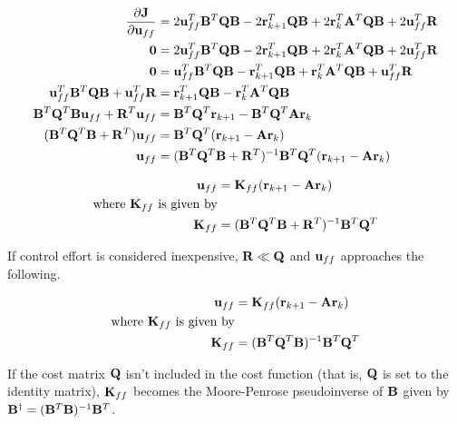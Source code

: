 \begin{align*}
  \frac{\partial\mathbf{J}}{\partial\mathbf{u}_{ff}} &=
    2\mathbf{u}_{ff}^T\mathbf{B}^T\mathbf{Q}\mathbf{B} - 2\mathbf{r}_{k+1}^T\mathbf{Q}\mathbf{B} +
    2\mathbf{r}_k^T\mathbf{A}^T\mathbf{Q}\mathbf{B} + 2\mathbf{u}_{ff}^T\mathbf{R} \\
  \mathbf{0} &= 2\mathbf{u}_{ff}^T\mathbf{B}^T\mathbf{Q}\mathbf{B} -
    2\mathbf{r}_{k+1}^T\mathbf{Q}\mathbf{B} + 2\mathbf{r}_k^T\mathbf{A}^T\mathbf{Q}\mathbf{B} +
    2\mathbf{u}_{ff}^T\mathbf{R} \\
  \mathbf{0} &= \mathbf{u}_{ff}^T\mathbf{B}^T\mathbf{Q}\mathbf{B} -
    \mathbf{r}_{k+1}^T\mathbf{Q}\mathbf{B} + \mathbf{r}_k^T\mathbf{A}^T\mathbf{Q}\mathbf{B} +
    \mathbf{u}_{ff}^T\mathbf{R} \\
  \mathbf{u}_{ff}^T\mathbf{B}^T\mathbf{Q}\mathbf{B} + \mathbf{u}_{ff}^T\mathbf{R} &=
    \mathbf{r}_{k+1}^T\mathbf{Q}\mathbf{B} - \mathbf{r}_k^T\mathbf{A}^T\mathbf{Q}\mathbf{B} \\
  \mathbf{B}^T\mathbf{Q}^T\mathbf{B}\mathbf{u}_{ff} + \mathbf{R}^T\mathbf{u}_{ff} &=
    \mathbf{B}^T\mathbf{Q}^T\mathbf{r}_{k+1} - \mathbf{B}^T\mathbf{Q}^T\mathbf{A}\mathbf{r}_k \\
  (\mathbf{B}^T\mathbf{Q}^T\mathbf{B} + \mathbf{R}^T)\mathbf{u}_{ff} &=
    \mathbf{B}^T\mathbf{Q}^T(\mathbf{r}_{k+1} - \mathbf{A}\mathbf{r}_k) \\
  \mathbf{u}_{ff} &= (\mathbf{B}^T\mathbf{Q}^T\mathbf{B} +
    \mathbf{R}^T)^{-1}\mathbf{B}^T\mathbf{Q}^T(\mathbf{r}_{k+1} - \mathbf{A}\mathbf{r}_k)
\end{align*}

\begin{theorem}
  \begin{align}
    \mathbf{u}_{ff} &= \mathbf{K}_{ff} (\mathbf{r}_{k+1} - \mathbf{A}\mathbf{r}_k) \\
    \text{where $\mathbf{K}_{ff}$ is given by} \nonumber \\
    \mathbf{K}_{ff} &=
      (\mathbf{B}^T\mathbf{Q}^T\mathbf{B} + \mathbf{R}^T)^{-1}\mathbf{B}^T\mathbf{Q}^T
  \end{align}
\end{theorem}

If control effort is considered inexpensive, $\mathbf{R} \ll \mathbf{Q}$ and
$\mathbf{u}_{ff}$ approaches the following.

\begin{theorem}
  \begin{align}
    \mathbf{u}_{ff} &= \mathbf{K}_{ff} (\mathbf{r}_{k+1} - \mathbf{A}\mathbf{r}_k) \\
    \text{where $\mathbf{K}_{ff}$ is given by} \nonumber \\
    \mathbf{K}_{ff} &= (\mathbf{B}^T\mathbf{Q}^T\mathbf{B})^{-1}\mathbf{B}^T\mathbf{Q}^T
  \end{align}
\end{theorem}

\begin{remark}
  If the cost matrix $\mathbf{Q}$ isn't included in the cost function (that is,
  $\mathbf{Q}$ is set to the identity matrix), $\mathbf{K}_{ff}$ becomes the
  Moore-Penrose pseudoinverse of $\mathbf{B}$ given by
  $\mathbf{B}^\dagger = (\mathbf{B}^T\mathbf{B})^{-1}\mathbf{B}^T$.
\end{remark}

